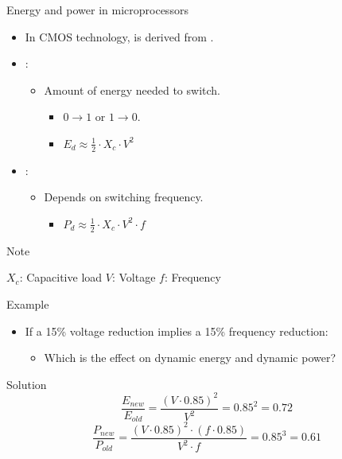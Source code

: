 \begin{frame}[t]{Energy and power in microprocessors}
\begin{itemize}
  \item In CMOS technology,  is derived from
        .

  \item {}:
    \begin{itemize}
      \item Amount of energy needed to switch.
        \begin{itemize}
          \item $0 \rightarrow 1$ or $1 \rightarrow 0$.
          \item $E_d \approx \frac{1}{2} \cdot X_c \cdot V^2$
        \end{itemize}
    \end{itemize}

  \item {}:
    \begin{itemize}
      \item Depends on switching frequency.
        \begin{itemize}
          \item $P_d \approx \frac{1}{2} \cdot X_c \cdot V^2 \cdot f$
        \end{itemize}
    \end{itemize}
\end{itemize}
\begin{block}{Note}
\begin{small}
  $X_c$: Capacitive load\qquad
  $V$: Voltage \qquad
  $f$: Frequency
\end{small}
\end{block}
\end{frame}

\begin{frame}[t]{Example}
\begin{itemize}
  \item If a 15\% voltage reduction implies a 15\% frequency reduction:
    \begin{itemize}
      \item Which is the effect on dynamic energy and dynamic power?
    \end{itemize}
\end{itemize}

\begin{block}{Solution}
\begin{displaymath}
\frac{E_{new}}{E_{old}} =
\frac
{(V \cdot 0.85)^2}
{V^2} =
0.85^2 =
0.72
\end{displaymath}
\pause
\begin{displaymath}
\frac{P_{new}}{P_{old}} =
\frac
{(V \cdot 0.85)^2 \cdot (f \cdot 0.85)}
{V^2 \cdot f} =
0.85^3 =
0.61
\end{displaymath}
\end{block}
\end{frame}

